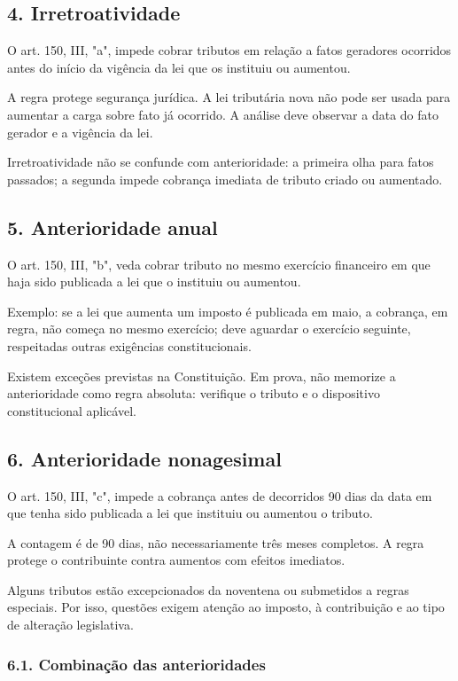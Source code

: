 \documentclass[11pt,a4paper]{article}
\begin{document}
\subsection*{4. Irretroatividade}

O art. 150, III, "a", impede cobrar tributos em relação a fatos geradores ocorridos antes do início da vigência da lei que os instituiu ou aumentou.

A regra protege segurança jurídica. A lei tributária nova não pode ser usada para aumentar a carga sobre fato já ocorrido. A análise deve observar a data do fato gerador e a vigência da lei.

Irretroatividade não se confunde com anterioridade: a primeira olha para fatos passados; a segunda impede cobrança imediata de tributo criado ou aumentado.

\subsection*{5. Anterioridade anual}

O art. 150, III, "b", veda cobrar tributo no mesmo exercício financeiro em que haja sido publicada a lei que o instituiu ou aumentou.

Exemplo: se a lei que aumenta um imposto é publicada em maio, a cobrança, em regra, não começa no mesmo exercício; deve aguardar o exercício seguinte, respeitadas outras exigências constitucionais.

Existem exceções previstas na Constituição. Em prova, não memorize a anterioridade como regra absoluta: verifique o tributo e o dispositivo constitucional aplicável.

\subsection*{6. Anterioridade nonagesimal}

O art. 150, III, "c", impede a cobrança antes de decorridos 90 dias da data em que tenha sido publicada a lei que instituiu ou aumentou o tributo.

A contagem é de 90 dias, não necessariamente três meses completos. A regra protege o contribuinte contra aumentos com efeitos imediatos.

Alguns tributos estão excepcionados da noventena ou submetidos a regras especiais. Por isso, questões exigem atenção ao imposto, à contribuição e ao tipo de alteração legislativa.

\subsubsection*{6.1. Combinação das anterioridades}
\end{document}
